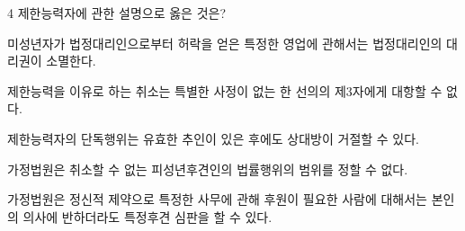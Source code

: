 \begin{question}{4}
제한능력자에 관한 설명으로 옳은 것은?
\begin{choices}
  \item 미성년자가 법정대리인으로부터 허락을 얻은 특정한 영업에 관해서는 법정대리인의 대리권이 소멸한다.
  \item 제한능력을 이유로 하는 취소는 특별한 사정이 없는 한 선의의 제3자에게 대항할 수 없다.
  \item 제한능력자의 단독행위는 유효한 추인이 있은 후에도 상대방이 거절할 수 있다.
  \item 가정법원은 취소할 수 없는 피성년후견인의 법률행위의 범위를 정할 수 없다.
  \item 가정법원은 정신적 제약으로 특정한 사무에 관해 후원이 필요한 사람에 대해서는 본인의 의사에 반하더라도 특정후견 심판을 할 수 있다.
\end{choices}
\end{question}
